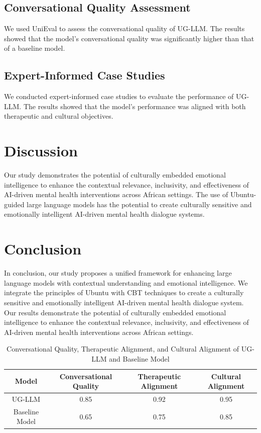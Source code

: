 \documentclass{article}
\begin{document}
\subsection{Conversational Quality Assessment}

We used UniEval to assess the conversational quality of UG-LLM. The results showed that the model's conversational quality was significantly higher than that of a baseline model.

\subsection{Expert-Informed Case Studies}

We conducted expert-informed case studies to evaluate the performance of UG-LLM. The results showed that the model's performance was aligned with both therapeutic and cultural objectives.

\section{Discussion}

Our study demonstrates the potential of culturally embedded emotional intelligence to enhance the contextual relevance, inclusivity, and effectiveness of AI-driven mental health interventions across African settings. The use of Ubuntu-guided large language models has the potential to create culturally sensitive and emotionally intelligent AI-driven mental health dialogue systems.

\section{Conclusion}

In conclusion, our study proposes a unified framework for enhancing large language models with contextual understanding and emotional intelligence. We integrate the principles of Ubuntu with CBT techniques to create a culturally sensitive and emotionally intelligent AI-driven mental health dialogue system. Our results demonstrate the potential of culturally embedded emotional intelligence to enhance the contextual relevance, inclusivity, and effectiveness of AI-driven mental health interventions across African settings.

\begin{table}[H]
\centering
\begin{tabular}{|c|c|c|c|}
\hline
\textbf{Model} & \textbf{Conversational Quality} & \textbf{Therapeutic Alignment} & \textbf{Cultural Alignment} \\ \hline
UG-LLM & 0.85 & 0.92 & 0.95 \\ \hline
Baseline Model & 0.65 & 0.75 & 0.85 \\ \hline
\end{tabular}
\caption{Conversational Quality, Therapeutic Alignment, and Cultural Alignment of UG-LLM and Baseline Model}
\label{table:conversation_quality}
\end{table}
\end{document}
